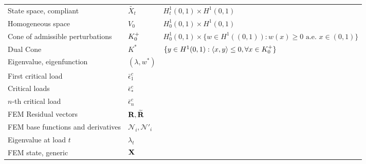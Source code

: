 \begin{table}[h!]
\begin{tabular}{  m{}  m{3cm}  m{5.5cm}  }
        State space, compliant              & $\widetilde{X_t}$                                  & $H^1_t(0,1)\times  H^1(0,1)$                                                    \\
        Homogeneous space                   & $V_0$                                              & $H^1_0(0,1)\times  H^1(0,1)$                                                    \\
        Cone of admissible perturbations    & $K^+_{0}$                                       & $H^1_0(0, 1)\times \{w \in H^1((0, 1)): w(x) \geq 0 \text{ a.e. }x\in (0, 1)\}$ \\
        Dual Cone                           & $K^*$                                              & $\{y \in H^1(0,1): \langle x,y \rangle \leq 0, \forall x \in K^+_{0}\}$      \\
        Eigenvalue, eigenfunction           & $(\lambda, w^*)$                                   &                                                                                 \\
        First critical load                 & $\bar \epsilon^c_1$                                &                                                                                 \\
        Critical loads                      & $\bar \epsilon^c_*$                                &                                                                                 \\
        $n$-th critical load                & $\bar \epsilon^c_n$                                &                                                                                 \\
        FEM Residual vectors                & ${\bf R}, \widetilde{\bf R}$                       &                                                                                 \\
        FEM base functions and derivatives  & ${\mathcal N}_i, {\mathcal N}'_i$                  &                                                                                 \\
        Eigenvalue at load $t$              & $\lambda_t$                                        &                                                                                 \\
        FEM state, generic                  & $\mathbf{X}$                                        &                                                                                 \\

\end{tabular}
\end{table}

